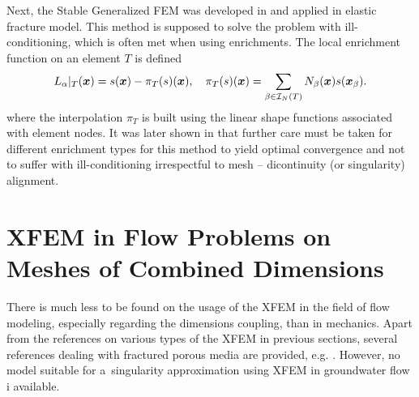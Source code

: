Next, the Stable Generalized FEM was developed in \cite{babuska_stable_2012, gupta_stable_2013}
and applied in elastic fracture model. This method is supposed to solve the problem with ill-conditioning,
which is often met when using enrichments. The local enrichment function on an element $T$ is defined
\begin{equation} \label{eqn:sgfem_enrich}
    L_{\alpha}|_{T}(\mathbf{\boldsymbol{x}}) = s(\mathbf{\boldsymbol{x}}) - \pi_T (s)(\mathbf{\boldsymbol{x}}),\quad \pi_T (s)(\mathbf{\boldsymbol{x}})=\sum_{\beta\in\mathcal{I}_N(T)} N_\beta(\mathbf{\boldsymbol{x}}) s(\mathbf{\boldsymbol{x}}_\beta). 
\end{equation} 
where the interpolation $\pi_T$ is built using the linear shape functions
associated with element nodes. It was later shown in \cite{zhang_robust_2016} that
further care must be taken for different enrichment types for this method to
yield optimal convergence and not to suffer with ill-conditioning irrespectful to mesh -- dicontinuity (or singularity) alignment.


\section{XFEM in Flow Problems on Meshes of Combined Dimensions} \label{sec:soa_xfem_combined}
There is much less to be found on the usage of the XFEM in the field of flow modeling, especially regarding the dimensions coupling,
than in mechanics. Apart from the references on various types of the XFEM in previous sections,
several references dealing with fractured porous media are provided, e.g. \cite{fumagalli_numerical_2012, schwenck_2015}.
However, no model suitable for a~singularity approximation using XFEM in groundwater flow i available.
